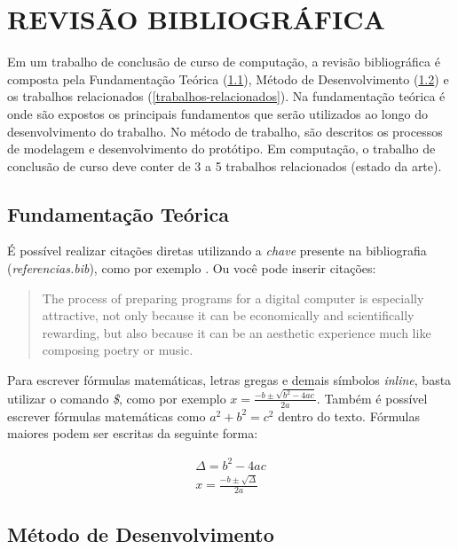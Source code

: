 \chapter{REVISÃO BIBLIOGRÁFICA}

Em um trabalho de conclusão de curso de computação, a revisão bibliográfica é composta pela Fundamentação Teórica (\ref{fundamentacao-teorica}), Método de Desenvolvimento (\ref{metodo-de-desenvolvimento}) e os trabalhos relacionados (\ref{trabalhos-relacionados}). Na fundamentação teórica é onde são expostos os principais fundamentos que serão utilizados ao longo do desenvolvimento do trabalho. No método de trabalho, são descritos os processos de modelagem e desenvolvimento do protótipo. Em computação, o trabalho de conclusão de curso deve conter de 3 a 5 trabalhos relacionados (estado da arte).

\section{Fundamentação Teórica}
\label{fundamentacao-teorica}
É possível realizar citações diretas utilizando a \emph{chave} presente na bibliografia (\emph{referencias.bib}), como por exemplo \cite{turing}. Ou você pode inserir citações:

\begin{quote}
    The process of preparing programs for a digital computer is especially attractive, not only because it can be economically and scientifically rewarding, but also because it can be an aesthetic experience much like composing poetry or music.
    
\end{quote}

Para escrever fórmulas matemáticas, letras gregas e demais símbolos \emph{inline}, basta utilizar o comando \emph{\$}, como por exemplo 
$ x = \frac{-b \pm \sqrt{b^2 - 4ac}}{2a} $. 
Também é possível escrever fórmulas matemáticas como 
\( a^2 + b^2 = c^2 \)
dentro do texto. Fórmulas maiores podem ser escritas da seguinte forma:

\begin{equation} \label{eq1}
    \begin{split}
    \Delta = b^2 - 4ac \\
     x = \frac{-b \pm \sqrt{\Delta}}{2a}
    \end{split}
\end{equation}

\section{Método de Desenvolvimento}
\label{metodo-de-desenvolvimento}

